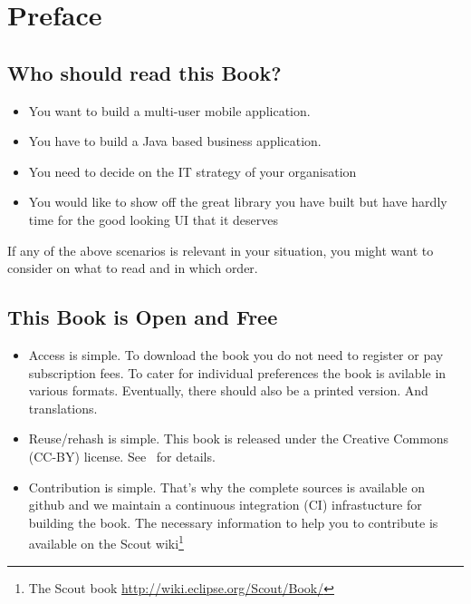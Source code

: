 \documentclass[a4paper,10pt,twoside]{book}
\begin{document}
  \sloppy
\fi


\chapter{Preface}


\section*{Who should read this Book?}

\begin{itemize}
\item You want to build a multi-user mobile application.
\item You have to build a Java based business application. 
\item You need to decide on the IT strategy of your organisation
\item You would like to show off the great library you have built but have hardly time for the good looking UI that it deserves
\end{itemize}

\noindent If any of the above scenarios is relevant in your situation, you might want to consider  on what to read and in which order.

\section*{This Book is Open and Free}

\begin{itemize}
\item Access is simple. 
To download the book you do not need to register or pay subscription fees. 
To cater for individual preferences the book is avilable in various formats. 
Eventually, there should also be a printed version. And translations.

\item Reuse/rehash is simple. 
This book is released under the Creative Commons (CC-BY) license. 
See~ for details.

\item Contribution is simple. 
That's why the complete sources is available on github and we maintain a continuous integration (CI) infrastucture for building the book. 
The necessary information to help you to contribute is available on the Scout
wiki\footnote{The Scout book \url{http://wiki.eclipse.org/Scout/Book/}}
\end{itemize}
\end{document}
